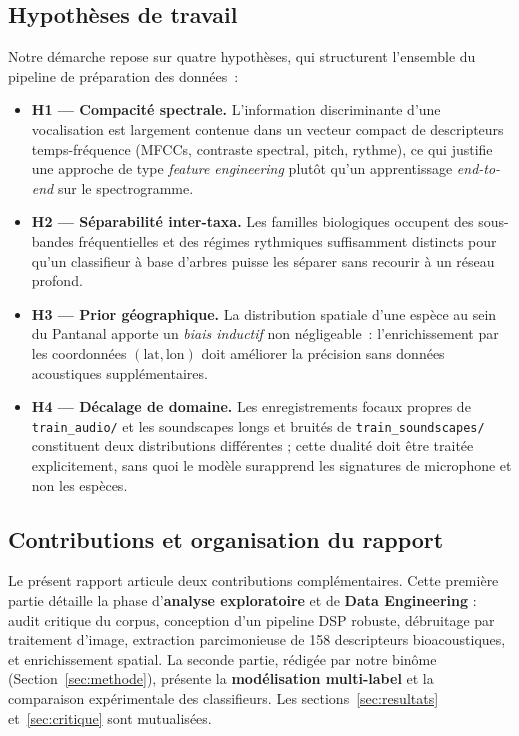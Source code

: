 \subsection{Hypothèses de travail}
Notre démarche repose sur quatre hypothèses, qui structurent l'ensemble du
pipeline de préparation des données~:
\begin{itemize}
    \item \textbf{H1 — Compacité spectrale.} L'information discriminante d'une
          vocalisation est largement contenue dans un vecteur compact de
          descripteurs temps-fréquence (MFCCs, contraste spectral, pitch, rythme), ce
          qui justifie une approche de type \textit{feature engineering} plutôt
          qu'un apprentissage \textit{end-to-end} sur le spectrogramme.
    \item \textbf{H2 — Séparabilité inter-taxa.} Les familles biologiques
          occupent des sous-bandes fréquentielles et des régimes rythmiques
          suffisamment distincts pour qu'un classifieur à base d'arbres puisse les
          séparer sans recourir à un réseau profond.
    \item \textbf{H3 — Prior géographique.} La distribution spatiale d'une
          espèce au sein du Pantanal apporte un \textit{biais inductif} non
          négligeable~: l'enrichissement par les coordonnées
          $(\text{lat}, \text{lon})$ doit améliorer la précision sans
          données acoustiques supplémentaires.
    \item \textbf{H4 — Décalage de domaine.} Les enregistrements focaux
          propres de \texttt{train\_audio/} et les soundscapes longs et bruités de
          \texttt{train\_soundscapes/} constituent deux distributions différentes ;
          cette dualité doit être traitée explicitement, sans quoi le modèle
          surapprend les signatures de microphone et non les espèces.
\end{itemize}

\subsection{Contributions et organisation du rapport}
Le présent rapport articule deux contributions complémentaires. Cette
première partie détaille la phase d'\textbf{analyse exploratoire} et de
\textbf{Data Engineering} : audit critique du corpus, conception d'un
pipeline DSP robuste, débruitage par traitement d'image, extraction
parcimonieuse de 158 descripteurs bioacoustiques, et enrichissement
spatial. La seconde partie, rédigée par notre binôme
(Section~\ref{sec:methode}), présente la \textbf{modélisation
    multi-label} et la comparaison expérimentale des classifieurs.
Les sections~\ref{sec:resultats} et~\ref{sec:critique} sont mutualisées.

